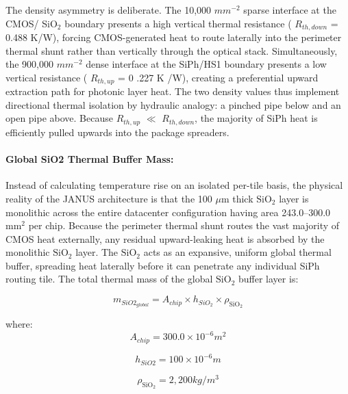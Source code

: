 \documentclass[journal]{IEEEtran}
\begin{document}
The density asymmetry is deliberate. The 10,000 $mm^{-2}$ sparse interface at the CMOS/ SiO$_2$ boundary presents a high vertical thermal resistance ( $R_{th,down}$ = 0.488 K/W), forcing CMOS-generated heat to route laterally into the perimeter thermal shunt rather than vertically through the optical stack. Simultaneously, the 900,000 $mm^{-2}$ dense interface at the SiPh/HS1 boundary presents a low vertical resistance ( $R_{th,up}$ = 0 .227 K /W), creating a preferential upward extraction path for photonic layer heat. The two density values thus implement directional thermal isolation by hydraulic analogy: a pinched pipe below and an open pipe above. Because $R_{th,up}$ $\ll$ $R_{th,down}$, the majority of SiPh heat is efficiently pulled upwards into the package spreaders.

\paragraph{\textbf{Global SiO2 Thermal Buffer Mass:}}

Instead of calculating temperature rise on an isolated per-tile basis, the physical reality of the JANUS architecture is that the 100 $\mu$m thick $\mathrm{SiO_2}$ layer is monolithic across the entire datacenter configuration having area 243.0--300.0 $\text{mm}^{2}$ per chip. Because the perimeter thermal shunt routes the vast majority of CMOS heat externally, any residual upward-leaking heat is absorbed by the monolithic $\mathrm{SiO_2}$ layer. The $\mathrm{SiO_2}$ acts as an expansive, uniform global thermal buffer, spreading heat laterally before it can penetrate any individual SiPh routing tile.
The total thermal mass of the global $\mathrm{SiO_2}$ buffer layer is:

\begin{equation}
m_{SiO2_{global}} = A_{chip} \times h_{SiO_2} \times \rho_{\text{SiO}_2}
\end{equation}

where:
\begin{equation}
A_{chip} = 300.0 \times 10^{-6} m^{2}
\end{equation}

\begin{equation}
h_{SiO2} = 100 \times 10^{-6} m
\end{equation}

\begin{equation}
\rho_{\text{SiO}_2} = 2,200 kg/m^{3}
\end{equation}
\end{document}
